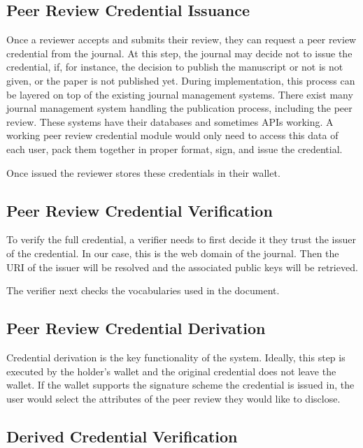 
\subsection{Peer Review Credential Issuance}

Once a reviewer accepts and submits their review, they can request a peer review credential from the journal. At this step, the journal may decide not to issue the credential, if, for instance, the decision to publish the manuscript or not is not given, or the paper is not published yet. During implementation, this process can be layered on top of the existing journal management systems. There exist many journal management system handling the publication process, including the peer review. These systems have their databases and sometimes APIs working. A working peer review credential module would only need to access this data of each user, pack them together in proper format, sign, and issue the credential. 

Once issued the reviewer stores these credentials in their wallet. 

\subsection{Peer Review Credential Verification}


To verify the full credential, a verifier needs to first decide it they trust the issuer of the credential. In our case, this is the web domain of the journal. Then the \acrshort{URI} of the issuer will be resolved and the associated public keys will be retrieved. 

The verifier next checks the vocabularies used in the document. 

\subsection{Peer Review Credential Derivation}

Credential derivation is the key functionality of the system. Ideally, this step is executed by the holder's wallet and the original credential does not leave the wallet. If the wallet supports the signature scheme the credential is issued in, the user would select the attributes of the peer review they would like to disclose. 

\subsection{Derived Credential Verification}

